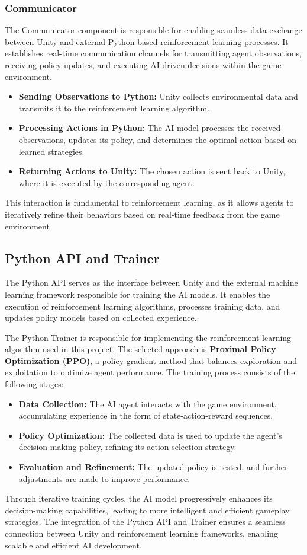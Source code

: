 \documentclass[12pt,oneside,openright,a4paper]{cpe-english-project}
\begin{document}
\subsubsection{Communicator}
The Communicator component is responsible for enabling seamless data exchange between Unity and external Python-based reinforcement learning processes. It establishes real-time communication channels for transmitting agent observations, receiving policy updates, and executing AI-driven decisions within the game environment.
\begin{itemize}
\item  \textbf{Sending Observations to Python:} Unity collects environmental data and transmits it to the reinforcement learning algorithm.
\item  \textbf{Processing Actions in Python:} The AI model processes the received observations, updates its policy, and determines the optimal action based on learned strategies.
\item  \textbf{Returning Actions to Unity:} The chosen action is sent back to Unity, where it is executed by the corresponding agent.
\end{itemize}
This interaction is fundamental to reinforcement learning, as it allows agents to iteratively refine their behaviors based on real-time feedback from the game environment

\subsection{Python API and Trainer}
The Python API serves as the interface between Unity and the external machine learning framework responsible for training the AI models. It enables the execution of reinforcement learning algorithms, processes training data, and updates policy models based on collected experience.\par
The Python Trainer is responsible for implementing the reinforcement learning algorithm used in this project. The selected approach is \textbf{Proximal Policy Optimization (PPO)}, a policy-gradient method that balances exploration and exploitation to optimize agent performance. The training process consists of the following stages:
\begin{itemize}
\item  \textbf{Data Collection:} The AI agent interacts with the game environment, accumulating experience in the form of state-action-reward sequences.
\item  \textbf{Policy Optimization:} The collected data is used to update the agent’s decision-making policy, refining its action-selection strategy.
\item  \textbf{Evaluation and Refinement:} The updated policy is tested, and further adjustments are made to improve performance.
\end{itemize}
Through iterative training cycles, the AI model progressively enhances its decision-making capabilities, leading to more intelligent and efficient gameplay strategies. The integration of the Python API and Trainer ensures a seamless connection between Unity and reinforcement learning frameworks, enabling scalable and efficient AI development.\par
\end{document}
